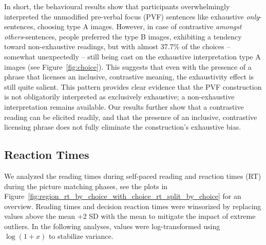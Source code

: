 \documentclass[a4paper, ruler]{CUP-JNL-LIN}%
\begin{document}

In short, the behavioural results show that participants overwhelmingly interpreted the unmodified pre-verbal focus (PVF) sentences like exhaustive \textit{only}-sentences, choosing type A images. However, in case of contrastive \textit{amongst others}-sentences, people preferred the type B images, exhibiting a tendency toward non-exhaustive readings, but with almost 37.7\% of the choices -- somewhat unexpectedly -- still being cast on the exhaustive interpretation type A images (see Figure~\ref{fig:choice}). This suggests that even with the presence of a phrase that licenses an inclusive, contrastive meaning, the exhaustivity effect is still quite salient. This pattern provides clear evidence that the PVF construction is not obligatorily interpreted as exclusively exhaustive; a non-exhaustive interpretation remains available. Our results further show that a contrastive reading can be elicited readily, and that the presence of an inclusive, contrastive licensing phrase does not fully eliminate the construction’s exhaustive bias.





\subsection{Reaction Times}

We analyzed the reading times during self-paced reading and reaction times (RT) during the picture matching phases, see the plots in Figure~\ref{fig:region_rt_by_choice_with_choice_rt_split_by_choice} for an overview. Reading times and decision reaction times were winsorized by replacing values above the mean +2 SD with the mean to mitigate the impact of extreme outliers. In the following analyses, values were log-transformed using $\log(1+x)$ to stabilize variance.
\end{document}
